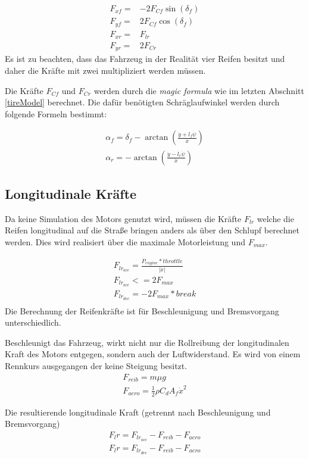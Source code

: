 \documentclass{like}
\begin{document}
\begin{eqnarray}
F_{xf} =& - 2 F_{Cf} \sin(\delta_f) \\
F_{yf} =& 2 F_{Cf} \cos(\delta_f) \\
F_{xr} =&   F_{lr} \\
F_{yr} =& 2 F_{Cr}
\end{eqnarray}
Es ist zu beachten, dass das Fahrzeug in der Realität vier Reifen besitzt und daher die Kräfte mit zwei multipliziert werden müssen.


Die Kräfte \(F_{Cf}\) und \(F_{Cr}\) werden durch die \textit{magic formula} wie im letzten Abschnitt \ref{tireModel} berechnet.
Die dafür benötigten Schräglaufwinkel werden durch folgende Formeln bestimmt:

\begin{eqnarray}
\alpha_f = \delta_f - \arctan(\frac{\dot{y} + l_f \dot{\psi}}{\dot{x}}) \\
\alpha_r = - \arctan(\frac{\dot{y} - l_r \dot{\psi}}{\dot{x}})
\end{eqnarray}

\subsection*{Longitudinale Kräfte}
Da keine Simulation des Motors genutzt wird, müssen die Kräfte \(F_{lr}\) welche die Reifen longitudinal auf die Straße bringen anders als über den Schlupf berechnet werden.
Dies wird realisiert über die maximale Motorleistung und \(F_{max}\).

\begin{eqnarray}
F_{lr_{acc}} = \frac{P_{engine} * throttle }{|\dot{x}|} \label{long_dyn_engine}\\
F_{lr_{acc}} <= 2 F_{max} \label{long_dyn_max}\\
F_{lr_{dec}} = - 2 F_{max} * break\\
\end{eqnarray}
Die Berechnung der Reifenkräfte ist für Beschleunigung und Bremsvorgang unterschiedlich.

Beschleunigt das Fahrzeug, wirkt nicht nur die Rollreibung der longitudinalen Kraft des Motors entgegen, sondern auch der Luftwiderstand. Es wird von einem Rennkurs ausgegangen der keine Steigung besitzt.
\begin{eqnarray}
F_{reib} = m \mu g \\
F_{aero} = \frac{1}{2} \rho C_d A_f \dot{x}^2
\end{eqnarray}

Die resultierende longitudinale Kraft (getrennt nach Beschleunigung und Bremsvorgang)
\begin{eqnarray}
F_lr = F_{lr_{acc}} - F_{reib} - F_{aero}\\
F_lr = F_{lr_{dec}} - F_{reib} - F_{aero}\\
\end{eqnarray}
\end{document}

